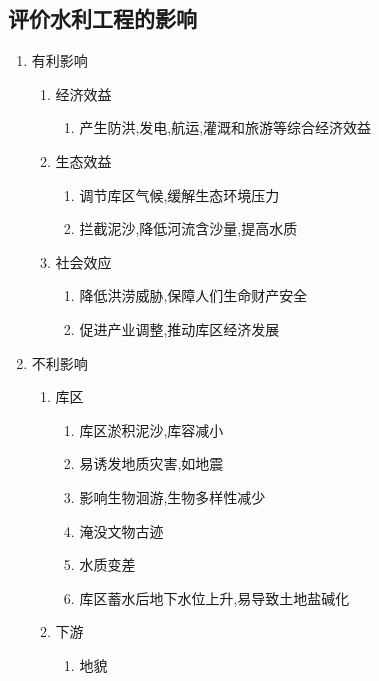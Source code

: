 \documentclass[a4paper]{article}
\begin{document}
    \subsection{评价水利工程的影响}
    \begin{enumerate}
        \item 有利影响
        \begin{enumerate}
            \item 经济效益
            \begin{enumerate}
                \item 产生防洪,发电,航运,灌溉和旅游等综合经济效益
            \end{enumerate}
            \item 生态效益
            \begin{enumerate}
                \item 调节库区气候,缓解生态环境压力
                \item 拦截泥沙,降低河流含沙量,提高水质
            \end{enumerate}
            \item 社会效应
            \begin{enumerate}
                \item 降低洪涝威胁,保障人们生命财产安全
                \item 促进产业调整,推动库区经济发展
            \end{enumerate}
        \end{enumerate}
        \item 不利影响
        \begin{enumerate}
            \item 库区
            \begin{enumerate}
                \item 库区淤积泥沙,库容减小
                \item 易诱发地质灾害,如地震
                \item 影响生物洄游,生物多样性减少
                \item 淹没文物古迹
                \item 水质变差
                \item 库区蓄水后地下水位上升,易导致土地盐碱化
            \end{enumerate}
            \item 下游
            \begin{enumerate}
                \item 地貌
                \begin{enumerate}

\end{enumerate}
\end{enumerate}
\end{enumerate}
\end{enumerate}
\end{document}

